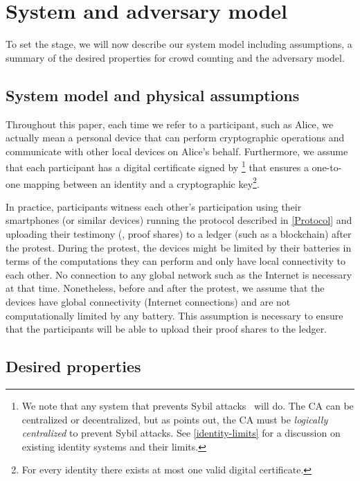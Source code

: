 \section{System and adversary model}%
\label{system-model}

To set the stage, we will now describe our system model including assumptions, a summary of the desired properties for crowd counting and the adversary model.

\subsection{System model and physical assumptions}%
\label{assumptions}

Throughout this paper, each time we refer to a participant, such as Alice, we 
actually mean a personal device that can perform cryptographic operations and 
communicate with other local devices on Alice's behalf.
Furthermore, we assume that each participant has a digital certificate signed 
by \footnote{%
  We note that any system that prevents Sybil attacks~\cite{SybilAttack} will 
  do.
  The \ac{CA} can be centralized or decentralized, but as 
  \textcite{SybilAttack} points out, the \ac{CA} must be \emph{logically 
    centralized} to prevent Sybil attacks.
  See \cref{identity-limits} for a discussion on existing identity systems and 
  their limits.
} that ensures a one-to-one mapping between an identity and a cryptographic 
key\footnote{%
  For every identity there exists at most one valid digital certificate.
}.

In practice, participants witness each other's participation using their smartphones (or similar devices) running the protocol described in \cref{Protocol} and uploading their testimony (\ie, proof shares) to a ledger (such as a blockchain) after the protest. 
During the protest, the devices might be limited by their batteries in terms of the computations they can perform and only have local connectivity to each other.
No connection to any global network such as the Internet is necessary at that time.  
Nonetheless, before and after the protest, we assume that the devices have global connectivity (\ie Internet connections) and are not computationally limited by any battery.
This assumption is necessary to ensure that the participants will be able to upload their proof shares to the ledger.

\subsection{Desired properties}%
\label{desired-properties}

